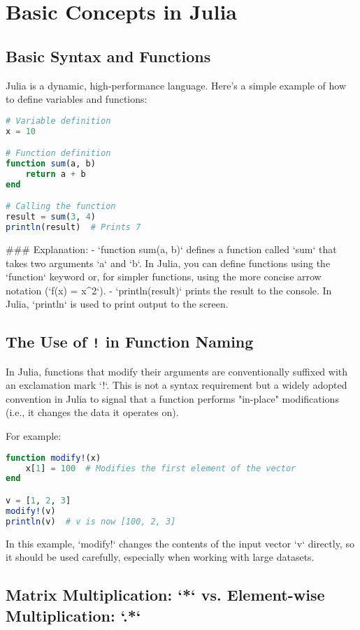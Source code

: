 \documentclass[a4paper,12pt]{article}
\begin{document}
\section{Basic Concepts in Julia}

\subsection{Basic Syntax and Functions}
Julia is a dynamic, high-performance language. Here’s a simple example of how to define variables and functions:

\begin{lstlisting}[language=Julia]
# Variable definition
x = 10

# Function definition
function sum(a, b)
    return a + b
end

# Calling the function
result = sum(3, 4)
println(result)  # Prints 7
\end{lstlisting}

### Explanation:
- `function sum(a, b)` defines a function called `sum` that takes two arguments `a` and `b`. In Julia, you can define functions using the `function` keyword or, for simpler functions, using the more concise arrow notation (`f(x) = x^2`).
- `println(result)` prints the result to the console. In Julia, `println` is used to print output to the screen.

\subsection{The Use of \texttt{!} in Function Naming}
In Julia, functions that modify their arguments are conventionally suffixed with an exclamation mark `!`. This is not a syntax requirement but a widely adopted convention in Julia to signal that a function performs "in-place" modifications (i.e., it changes the data it operates on).

For example:
\begin{lstlisting}[language=Julia]
function modify!(x)
    x[1] = 100  # Modifies the first element of the vector
end

v = [1, 2, 3]
modify!(v)
println(v)  # v is now [100, 2, 3]
\end{lstlisting}

In this example, `modify!` changes the contents of the input vector `v` directly, so it should be used carefully, especially when working with large datasets.

\subsection{Matrix Multiplication: `*` vs. Element-wise Multiplication: `.*`}
\end{document}
